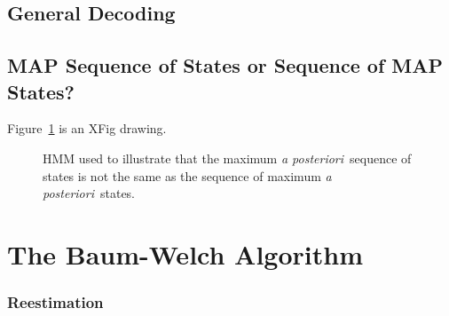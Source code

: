 \documentclass[prelim,showlabels]{book}
\newcommand{\apost}{\emph{a posteriori}\xspace}
\newcommand{\plotsize}{\small}
\begin{document}
\subsection{General Decoding}
\label{sec:GenDecode}

\subsection{MAP Sequence of States or Sequence of MAP States?}
\label{sec:sequenceMAP}

Figure~\ref{fig:sequenceMAP} is an XFig drawing.
\begin{figure}[htbp]
  \centering{\plotsize%
    
  }
  \caption{HMM used to illustrate that the maximum \apost\ sequence of states is
    not the same as the sequence of maximum \apost\ states.}
\label{fig:sequenceMAP}
\end{figure}

\section{The Baum-Welch Algorithm}
\label{sec:baum_welch}

\addtocounter{subsection}{1}

\subsubsection{Reestimation}
\end{document}
